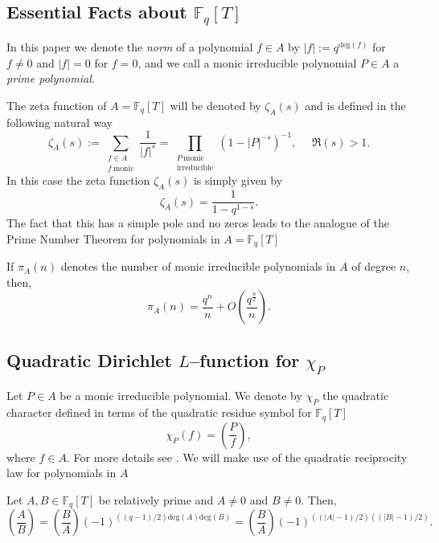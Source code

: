\documentclass[11pt]{amsart}
\begin{document}
\subsection{Essential Facts about $\mathbb{F}_{q}[T]$}
In this paper we denote the \textit{norm} of a polynomial $f\in A$ by $|f|:=q^{\mathrm{deg}(f)}$ for $f\neq0$ and $|f|=0$ for $f=0$, and we call a monic irreducible polynomial $P\in A$ a \textit{prime polynomial}.

The zeta function of $A=\mathbb{F}_{q}[T]$ will be denoted by $\zeta_{A}(s)$ and is defined in the following natural way
\begin{equation}
\label{eq:zetaA}
\zeta_{A}(s):=\sum_{\substack{f\in A \\ f \ \mathrm{monic}}}\frac{1}{|f|^{s}}=\prod_{\substack{P \ \mathrm{monic} \\ \mathrm{irreducible}}}\left(1-|P|^{-s}\right)^{-1}, \ \ \ \ \ \ \mathfrak{R}(s)>1.
\end{equation}
In this case the zeta function $\zeta_{A}(s)$ is simply given by
\begin{equation}\label{eq:zetaA1}
\zeta_{A}(s)=\frac{1}{1-q^{1-s}}.
\end{equation}
The fact that this has a simple pole and no zeros leads to the analogue of the Prime Number Theorem for polynomials in $A=\mathbb{F}_{q}[T]$
\begin{thm}
\label{thm:pnt}
If $\pi_{A}(n)$ denotes the number of monic irreducible polynomials in $A$ of degree $n$, then, 
\begin{equation}
\pi_{A}(n)=\frac{q^{n}}{n}+O\left(\frac{q^{\tfrac{n}{2}}}{n}\right).
\end{equation}
\end{thm}

\subsection{Quadratic Dirichlet $L$--function for $\chi_{P}$}

Let $P\in A$ be a monic irreducible polynomial.  We denote by $\chi_{P}$ the quadratic character defined in terms of the quadratic residue symbol for $\mathbb{F}_{q}[T]$
\begin{equation}
\chi_{P}(f)=\left(\frac{P}{f}\right),
\end{equation} 
where $f\in A$. For more details see \cite[Chapters 3, 4]{Ro}. We will make use of the quadratic reciprocity law for polynomials in $A$ 
\begin{thm}
\label{reciprocity}
Let $A,B\in\mathbb{F}_{q}[T]$ be relatively prime and $A\neq0$ and $B\neq0$. Then,
\begin{equation}
\left(\frac{A}{B}\right)=\left(\frac{B}{A}\right)(-1)^{((q-1)/2)\mathrm{deg}(A)\mathrm{deg}(B)}=\left(\frac{B}{A}\right)(-1)^{((|A|-1)/2)((|B|-1)/2)}.
\end{equation}
\end{thm}
\end{document}
